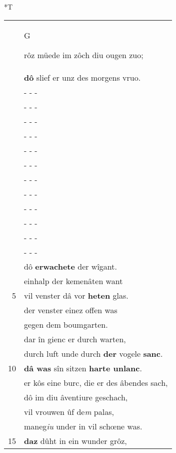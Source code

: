 \documentclass[8pt,a4paper,notitlepage]{article}
\begin{document}
\begin{table}[ht]
\begin{minipage}[t]{0.5\linewidth}
\end{minipage}
\hspace{0.5cm}
\begin{minipage}[t]{0.5\linewidth}
\small
\begin{center}*T
\end{center}
\begin{tabular}{rl}
 & \begin{large}G\end{large}rôz müede im zôch diu ougen zuo;\\ 
 & \textbf{dô} slief er unz des morgens vruo.\\ 
 & \multicolumn{1}{l}{ - - - }\\ 
 & \multicolumn{1}{l}{ - - - }\\ 
 & \multicolumn{1}{l}{ - - - }\\ 
 & \multicolumn{1}{l}{ - - - }\\ 
 & \multicolumn{1}{l}{ - - - }\\ 
 & \multicolumn{1}{l}{ - - - }\\ 
 & \multicolumn{1}{l}{ - - - }\\ 
 & \multicolumn{1}{l}{ - - - }\\ 
 & \multicolumn{1}{l}{ - - - }\\ 
 & \multicolumn{1}{l}{ - - - }\\ 
 & \multicolumn{1}{l}{ - - - }\\ 
 & \multicolumn{1}{l}{ - - - }\\ 
 & dô \textbf{erwachete} der wîgant.\\ 
 & einhalp der kemenâten want\\ 
5 & vil venster dâ vor \textbf{heten} glas.\\ 
 & der venster einez offen was\\ 
 & gegen dem boumgarten.\\ 
 & dar în gienc er durch warten,\\ 
 & durch luft unde durch \textbf{der} vogele \textbf{sanc}.\\ 
10 & \textbf{dâ was} sîn sitzen \textbf{harte unlanc}.\\ 
 & er kôs eine burc, die er des âbendes sach,\\ 
 & dô im diu âventiure geschach,\\ 
 & vil vrouwen ûf de\textit{m} palas,\\ 
 & maneg\textit{iu} under in vil schœne was.\\ 
15 & \textbf{daz} dûht in ein wunder grôz,\\ 

\end{tabular}
\end{minipage}
\end{table}
\end{document}

